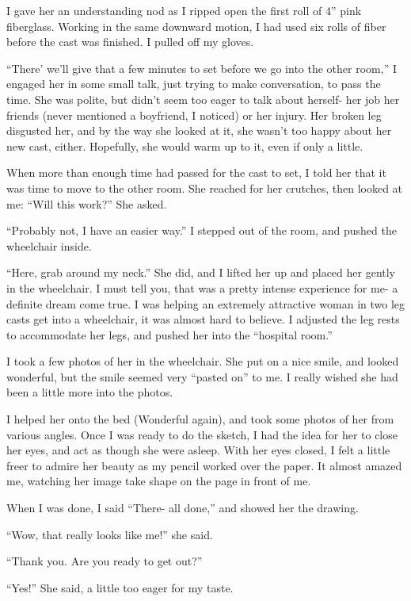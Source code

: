 I gave her an understanding nod as I ripped open the first roll of 4'' pink fiberglass.
Working in the same downward motion, I had used six rolls of fiber before the cast was finished.
I pulled off my gloves.

``There' we'll give that a few minutes to set before we go into the other room,'' I engaged
her in some small talk, just trying to make conversation, to pass the time. She was polite, but
didn't seem too eager to talk about herself- her job her friends (never mentioned a boyfriend, I
noticed) or her injury. Her broken leg disgusted her, and by the way she looked at it, she
wasn't too happy about her new cast, either. Hopefully, she would warm up to it, even if only a
little.

When more than enough time had passed for the cast to set, I told her that it was time to
move to the other room. She reached for her crutches, then looked at me: ``Will this work?'' She
asked.

``Probably not, I have an easier way.'' I stepped out of the room, and pushed the wheelchair
inside.

``Here, grab around my neck.'' She did, and I lifted her up and placed her gently in the
wheelchair. I must tell you, that was a pretty intense experience for me- a definite dream come
true. I was helping an extremely attractive woman in two leg casts get into a wheelchair, it was
almost hard to believe. I adjusted the leg rests to accommodate her legs, and pushed her into
the ``hospital room.''

I took a few photos of her in the wheelchair. She put on a nice smile, and looked wonderful,
but the smile seemed very ``pasted on'' to me. I really wished she had been a little more into
the photos.

I helped her onto the bed (Wonderful again), and took some photos of her from various
angles. Once I was ready to do the sketch, I had the idea for her to close her eyes, and act as
though she were asleep. With her eyes closed, I felt a little freer to admire her beauty as my
pencil worked over the paper. It almost amazed me, watching her image take shape on the page in
front of me.

When I was done, I said ``There- all done,'' and showed her the drawing.

``Wow, that really looks like me!'' she said.

``Thank you. Are you ready to get out?''

``Yes!'' She said, a little too eager for my taste.

